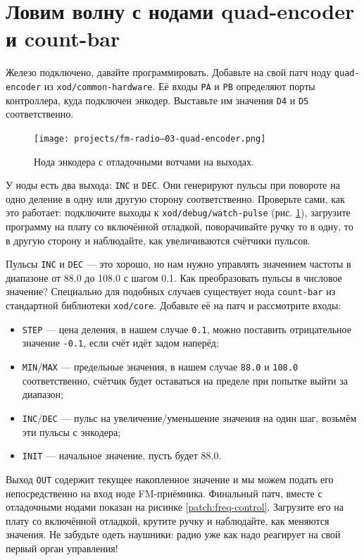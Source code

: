 \section{Ловим волну с нодами quad-encoder и count-bar}

Железо подключено, давайте программировать. Добавьте на свой патч ноду \texttt{quad-encoder} из \texttt{xod/common-hardware}. Её входы \texttt{PA} и \texttt{PB} определяют порты контроллера, куда подключен энкодер. Выставьте им значения \texttt{D4} и \texttt{D5} соответственно.

\begin{figure}
  \centering
  \texttt{[image: projects/fm-radio--03-quad-encoder.png]}
  \caption{Нода энкодера с отладочными вотчами на выходах.}
  \label{patch:quad-enc}
\end{figure}

У ноды есть два выхода: \texttt{INC} и \texttt{DEC}. Они генерируют пульсы при повороте на одно деление в одну или другую сторону соответственно. Проверьте сами, как это работает: подключите выходы к \texttt{xod/debug/watch-pulse} (рис. \ref{patch:quad-enc}), загрузите программу на плату со включённой отладкой, поворачивайте ручку то в одну, то в другую сторону и наблюдайте, как увеличиваются счётчики пульсов.

Пульсы \texttt{INC} и \texttt{DEC} — это хорошо, но нам нужно управлять значением частоты в диапазоне от 88.0 до 108.0 с шагом 0.1. Как преобразовать пульсы в числовое значение? Специально для подобных случаев существует нода \texttt{count-bar} из стандартной библиотеки \texttt{xod/core}. Добавьте её на патч и рассмотрите входы:

\begin{itemize}
  \item \texttt{STEP} — цена деления, в нашем случае \texttt{0.1}, можно поставить отрицательное значение \texttt{-0.1}, если счёт идёт задом наперёд;
  \item \texttt{MIN}/\texttt{MAX} — предельные значения, в нашем случае \texttt{88.0} и \texttt{108.0} соответственно, счётчик будет оставаться на пределе при попытке выйти за диапазон;
  \item \texttt{INC}/\texttt{DEC} — пульс на увеличение/уменьшение значения на один шаг, возьмём эти пульсы с энкодера;
  \item \texttt{INIT} — начальное значение, пусть будет {88.0}.
\end{itemize}

Выход \texttt{OUT} содержит текущее накопленное значение и мы можем подать его непосредственно на вход ноде FM-приёмника. Финальный патч, вместе с отладочными нодами показан на рисинке \ref{patch:freq-control}. Загрузите его на плату со включённой отладкой, крутите ручку и наблюдайте, как меняются значения. Не забудьте одеть наушники: радио уже как надо реагирует на свой первый орган управления!

